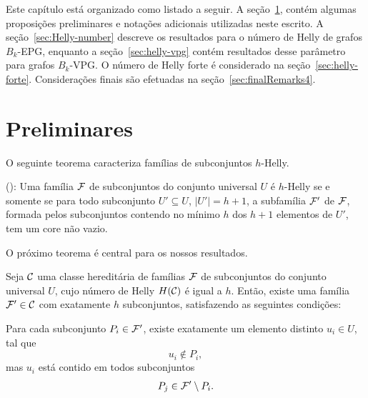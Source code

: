 Este capítulo está organizado como listado a seguir. A seção~\ref{sec:preliminares4}, contém algumas proposições preliminares e notações adicionais utilizadas neste escrito. A seção~\ref{sec:Helly-number}  descreve os resultados para o número de Helly de grafos $B_k$-EPG, enquanto a seção~\ref{sec:helly-vpg} contém resultados desse parâmetro para grafos $B_k$-VPG. O número de Helly forte é considerado na seção~\ref{sec:helly-forte}. Considerações finais são efetuadas na seção~\ref{sec:finalRemarks4}.

\section{Preliminares}\label{sec:preliminares4}

O seguinte teorema caracteriza famílias de subconjuntos $h$-Helly.


\begin{theorem}\label{thm:BD}(\cite{bergeDuchet1975}):
Uma família $\cal{F}$ de subconjuntos do conjunto universal  $U$ é $h$-Helly se e somente se para todo subconjunto   $U' \subseteq U$, $|U'|= h+1$,  a subfamília  $\cal{F'}$ de $\cal{F}$,  formada pelos subconjuntos contendo no mínimo  $h$ dos $h+1$ elementos de $U'$, tem um core não vazio. 
\end{theorem}

O próximo teorema é central para os nossos resultados.

\begin{theorem}\label{thm:minimal}Seja ${\cal C}$ uma classe hereditária de famílias ${\cal F}$ de subconjuntos do conjunto universal $U$, cujo número de Helly $H({\cal C})$ é igual a $h$. Então, existe uma família ${\cal F'} \in {\cal C}$ com exatamente $h$ subconjuntos, satisfazendo as seguintes condições: 

Para cada subconjunto  $P_i \in \cal {F'}$, existe exatamente um elemento distinto $u_i \in U$, tal que \\
$$u_i \not \in P_i,$$ 
mas $u_i$ está contido em todos subconjuntos 
$$P_j \in {\cal F'} \setminus P_i.$$
\end{theorem}
 

